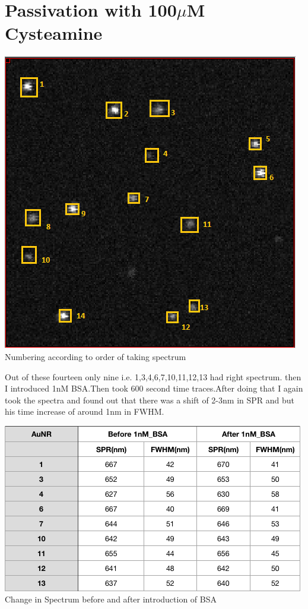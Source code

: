 \documentclass[twoside,single]{lion-msc}
\begin{document}
\section{Passivation with 100$\mu$M Cysteamine}
\begin{center}
\includegraphics[scale=.75]{6.png}\\
Numbering according to order of taking spectrum
\end{center}
Out of these fourteen only nine i.e. 1,3,4,6,7,10,11,12,13 had right spectrum.
then I introduced 1nM BSA.Then took 600 second time traces.After doing that I again took the spectra and found out that there was a shift of 2-3nm in SPR and but his time increase of around 1nm in FWHM.
\begin{center}
\includegraphics[scale=.6]{5.png}\\
Change in Spectrum before and after introduction of BSA
\end{center}
\end{document}
